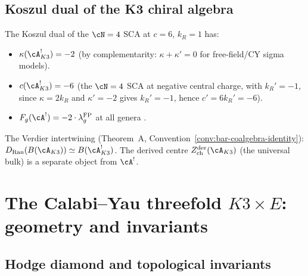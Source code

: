\subsection{Koszul dual of the K3 chiral algebra}
\label{subsec:koszul-dual-k3}

\begin{proposition}
\label{prop:koszul-dual-k3}
The Koszul dual of the $\cN = 4$ SCA at $c = 6$, $k_R = 1$ has:
\begin{itemize}
\item $\kappa(\cA_{K3}^!) = -2$ \textup{(}by complementarity:
 $\kappa + \kappa' = 0$ for free-field/CY sigma models\textup{)}.
\item $c(\cA_{K3}^!) = -6$
 \textup{(}the $\cN = 4$ SCA at negative central charge, with
 $k_R' = -1$, since $\kappa = 2k_R$ and $\kappa' = -2$ gives
 $k_R' = -1$, hence $c' = 6k_R' = -6$\textup{)}.
\item $F_g(\cA^!) = -2 \cdot \lambda_g^{\mathrm{FP}}$ at all
 genera .
\end{itemize}
The Verdier intertwining \textup{(}Theorem~A,
Convention~\textup{\ref{conv:bar-coalgebra-identity}):}
$D_{\mathrm{Ran}}(B(\cA_{K3})) \simeq B(\cA_{K3}^!)$.
The derived centre $Z^{\mathrm{der}}_{\mathrm{ch}}(\cA_{K3})$
\textup{(}the universal bulk\textup{)} is a separate object
from $\cA^!$.
\end{proposition}



\section{The Calabi--Yau threefold \texorpdfstring{$K3 \times E$}{K3 x E}:
geometry and invariants}
\label{sec:k3xe-geometry}

\subsection{Hodge diamond and topological invariants}
\label{subsec:hodge-k3xe}

